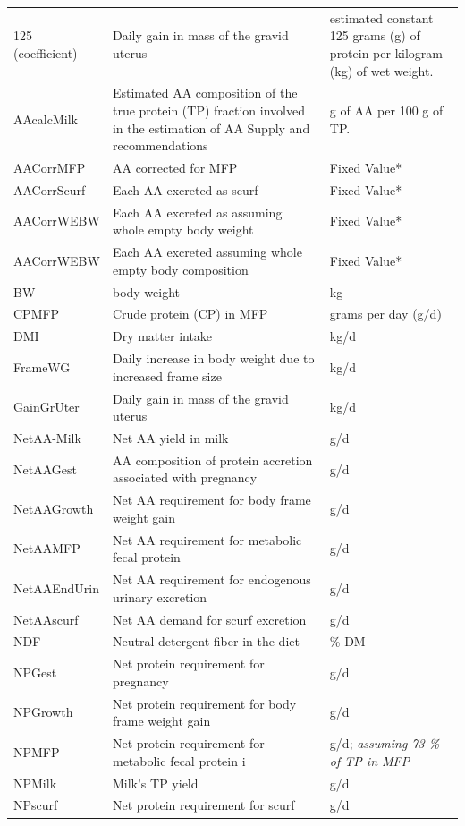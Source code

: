 \documentclass{article}
\begin{document}
\begin{refsection}
\begin{itemize}
\begin{longtable}{@{} L{3.5cm} L{5.5cm} L{3.5cm} @{}}
    
125 (coefficient)  &  Daily gain in mass of the gravid uterus &  estimated constant 125 grams (g) of protein per kilogram (kg) of wet weight.\\
AAcalcMilk  &  Estimated AA composition of the true protein (TP) fraction involved in the estimation of AA Supply and recommendations &  g of AA per 100 g of TP.\\
AACorrMFP  &  AA corrected for MFP  & Fixed Value*\\
AACorrScurf & Each AA excreted as scurf  &  Fixed Value*\\
AACorrWEBW  &  Each AA excreted as assuming whole empty body weight  &  Fixed Value*\\
AACorrWEBW  &  Each AA excreted assuming whole empty body composition  &  Fixed Value*\\
BW  &  body weight  & kg\\
CPMFP  &  Crude protein (CP) in MFP  &  grams per day (g/d)\\
DMI  &  Dry matter intake &  kg/d\\
FrameWG  &  Daily increase in body weight due to increased frame size &  kg/d\\
GainGrUter  &  Daily gain in mass of the gravid uterus  &  kg/d \\
NetAA-Milk  &  Net AA yield in milk  &  g/d\\
NetAAGest  &  AA composition of protein accretion associated with pregnancy & g/d \\
NetAAGrowth  &  Net AA requirement for body frame weight gain  &  g/d\\
NetAAMFP &  Net AA requirement for metabolic fecal protein  &  g/d\\
NetAAEndUrin  &  Net AA requirement for endogenous urinary excretion  & g/d\\
NetAAscurf  &  Net AA demand for scurf excretion  &  g/d\\
NDF  &  Neutral detergent fiber in the diet &  \% DM\\
NPGest &  Net protein requirement for pregnancy  &  g/d\\
NPGrowth &  Net protein requirement for body frame weight gain &  g/d \\
NPMFP  &  Net protein requirement for metabolic fecal protein i & g/d; \textit{\small{assuming 73 \% of TP in MFP}}\\
NPMilk  &  Milk's TP yield  &  g/d \\
NPscurf  &   Net protein requirement for scurf  &  g/d \\

\end{longtable}
\end{itemize}
\end{refsection}
\end{document}
